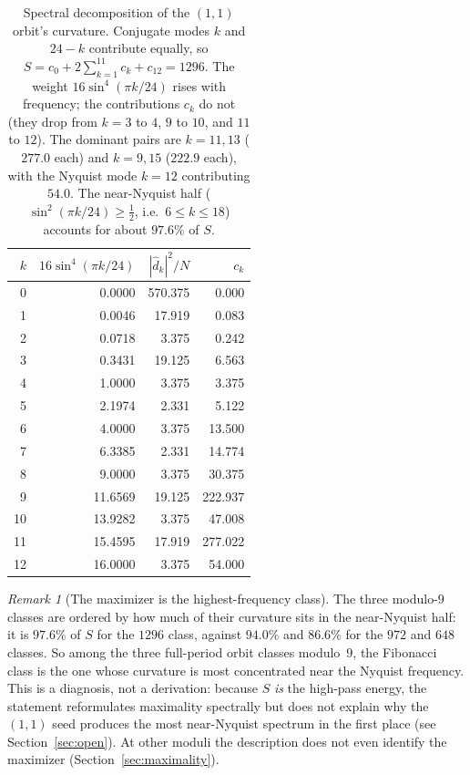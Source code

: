 \documentclass[12pt]{article}
\theoremstyle{remark}
\newtheorem{rem}{Remark}
\begin{document}
\begin{table}[!ht]
\centering
\begin{tabular}{rrrr}
\toprule
$k$ & $16\sin^4(\pi k/24)$ & $|\hat d_k|^2/N$ & $c_k$\\
\midrule
0  & 0.0000  & 570.375 & 0.000\\
1  & 0.0046  & 17.919  & 0.083\\
2  & 0.0718  & 3.375   & 0.242\\
3  & 0.3431  & 19.125  & 6.563\\
4  & 1.0000  & 3.375   & 3.375\\
5  & 2.1974  & 2.331   & 5.122\\
6  & 4.0000  & 3.375   & 13.500\\
7  & 6.3385  & 2.331   & 14.774\\
8  & 9.0000  & 3.375   & 30.375\\
9  & 11.6569 & 19.125  & 222.937\\
10 & 13.9282 & 3.375   & 47.008\\
11 & 15.4595 & 17.919  & 277.022\\
12 & 16.0000 & 3.375   & 54.000\\
\bottomrule
\end{tabular}
\caption{Spectral decomposition of the $(1,1)$ orbit's curvature. Conjugate modes $k$ and
$24-k$ contribute equally, so $S=c_0+2\sum_{k=1}^{11}c_k+c_{12}=1296$. The weight
$16\sin^4(\pi k/24)$ rises with frequency; the contributions $c_k$ do not (they drop from
$k=3$ to $4$, $9$ to $10$, and $11$ to $12$). The dominant pairs are $k=11,13$ ($277.0$
each) and $k=9,15$ ($222.9$ each), with the Nyquist mode $k=12$ contributing $54.0$. The
near-Nyquist half
($\sin^2(\pi k/24)\ge\frac12$, i.e.\ $6\le k\le 18$) accounts for about $97.6\%$ of $S$.}
\label{tab:spectrum}
\end{table}

\begin{rem}[The maximizer is the highest-frequency class]
The three modulo-$9$ classes are ordered by how much of their curvature sits in the
near-Nyquist half: it is $97.6\%$ of $S$ for the $1296$ class, against $94.0\%$ and
$86.6\%$ for the $972$ and $648$ classes. So among the three full-period orbit classes
modulo~$9$, the Fibonacci class is the one whose curvature is most concentrated near the
Nyquist frequency. This is a diagnosis, not a derivation: because $S$ \emph{is} the
high-pass energy, the statement reformulates maximality spectrally but does not explain
why the $(1,1)$ seed produces the most near-Nyquist spectrum in the first place
(see Section~\ref{sec:open}). At other moduli the description does not even identify the
maximizer (Section~\ref{sec:maximality}).
\end{rem}
\end{document}
